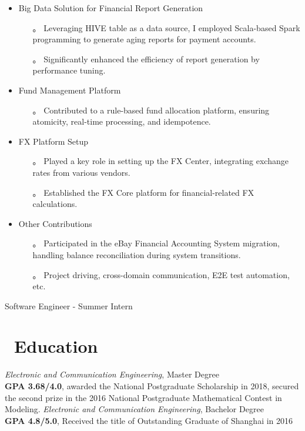 \documentclass{resume}
\begin{document}
\begin{itemize}
  \item Big Data Solution for Financial Report Generation
  \begin{itemize}
    \item[。] Leveraging HIVE table as a data source, I employed Scala-based Spark programming to generate aging reports for payment accounts.
    \item[。] Significantly enhanced the efficiency of report generation by performance tuning.
  \end{itemize}

  \item Fund Management Platform
  \begin{itemize}
    \item[。] Contributed to a rule-based fund allocation platform, ensuring atomicity, real-time processing, and idempotence.
  \end{itemize}

  \item FX Platform Setup
  \begin{itemize}
    \item[。] Played a key role in setting up the FX Center, integrating exchange rates from various vendors.
    \item[。] Established the FX Core platform for financial-related FX calculations.
  \end{itemize}

\item Other Contributions
  \begin{itemize}
    \item[。] Participated in the eBay Financial Accounting System migration, handling balance reconciliation during system transitions.
    \item[。] Project driving, cross-domain communication, E2E test automation, etc.
  \end{itemize}
\end{itemize}

Software Engineer - Summer Intern

\section{\faGraduationCap\ Education}
\textit{Electronic and Communication Engineering}, Master Degree
\\ \textbf{GPA 3.68/4.0}, awarded the National Postgraduate Scholarship in 2018, secured the second prize in the 2016 National Postgraduate Mathematical Contest in Modeling.
\textit{Electronic and Communication Engineering}, Bachelor Degree
\\ \textbf{GPA 4.8/5.0}, Received the title of Outstanding Graduate of Shanghai in 2016
\end{document}
